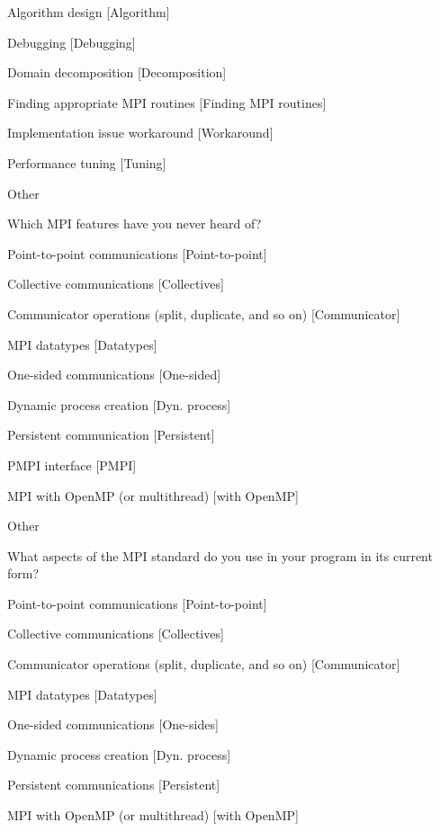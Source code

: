 \documentclass[preprint,5p,times]{elsarticle}
\begin{document}
{\begin{description}
\begin{inparaenum}[{\bf C}1)]
    \item Algorithm design [Algorithm]
    \item Debugging [Debugging]
    \item Domain decomposition [Decomposition]
    \item Finding appropriate MPI routines [Finding MPI routines]
    \item Implementation issue workaround [Workaround]
    \item Performance tuning [Tuning]
    \item Other
    \end{inparaenum}
  \item[Q16*:] Which MPI features have you never heard of?
    \begin{inparaenum}[{\bf C}1)]
    \item Point-to-point communications [Point-to-point]
    \item Collective communications [Collectives]
    \item Communicator operations (split, duplicate, and so on) [Communicator]
    \item MPI datatypes [Datatypes]
    \item One-sided communications [One-sided]
    \item Dynamic process creation [Dyn. process]
    \item Persistent communication [Persistent]
    \item PMPI interface [PMPI]
    \item MPI with OpenMP (or multithread) [with OpenMP]
    \item Other
    \end{inparaenum}
  \item[Q17*:] What aspects of the MPI standard do you use in your program in its current form?
    \begin{inparaenum}[{\bf C}1)]
    \item Point-to-point communications [Point-to-point]
    \item Collective communications [Collectives]
    \item Communicator operations (split, duplicate, and so on) [Communicator]
    \item MPI datatypes [Datatypes]
    \item One-sided communications [One-sides]
    \item Dynamic process creation [Dyn. process]
    \item Persistent communications [Persistent]
    \item MPI with OpenMP (or multithread) [with OpenMP]

\end{inparaenum}
\end{description}}
\end{document}
